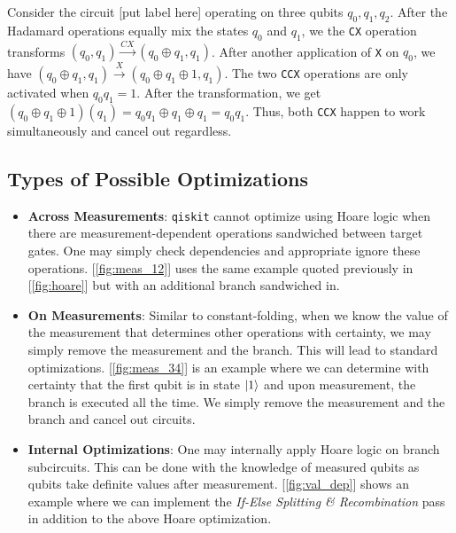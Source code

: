 \documentclass[10pt]{article}
\begin{document}
Consider the circuit [put label here] operating on three qubits $q_0, q_1, q_2$. After the Hadamard operations equally mix the states $q_0$ and $q_1$, we the \texttt{CX} operation transforms $(q_0, q_1) \xrightarrow{CX} (q_0 \oplus q_1, q_1)$. After another application of \texttt{X} on $q_0$, we have $(q_0 \oplus q_1, q_1) \xrightarrow{X} (q_0 \oplus q_1 \oplus 1, q_1)$. The two \texttt{CCX} operations are only activated when $q_0q_1 = 1$. After the transformation, we get $(q_0 \oplus q_1 \oplus 1)(q_1) = q_0q_1 \oplus q_1 \oplus q_1 = q_0q_1$. Thus, both \texttt{CCX} happen to work simultaneously and cancel out regardless.

\subsection{Types of Possible Optimizations}
\begin{itemize}
  \item \textbf{Across Measurements}: \texttt{qiskit} cannot optimize using Hoare logic when there are measurement-dependent operations sandwiched between target gates. One may simply check dependencies and appropriate ignore these operations. [\ref{fig:meas_12}] uses the same example quoted previously in [\ref{fig:hoare}] but with an additional branch sandwiched in.

  \item \textbf{On Measurements}: Similar to constant-folding, when we know the value of the measurement that determines other operations with certainty, we may simply remove the measurement and the branch. This will lead to standard optimizations. [\ref{fig:meas_34}] is an example where we can determine with certainty that the first qubit is in state $\ket{1}$ and upon measurement, the branch is executed all the time. We simply remove the measurement and the branch and cancel out circuits.

  \item \textbf{Internal Optimizations}: One may internally apply Hoare logic on branch subcircuits. This can be done with the knowledge of measured qubits as qubits take definite values after measurement. [\ref{fig:val_dep}] shows an example where we can implement the \emph{If-Else Splitting \& Recombination} pass in addition to the above Hoare optimization. 
\end{itemize}
\end{document}
